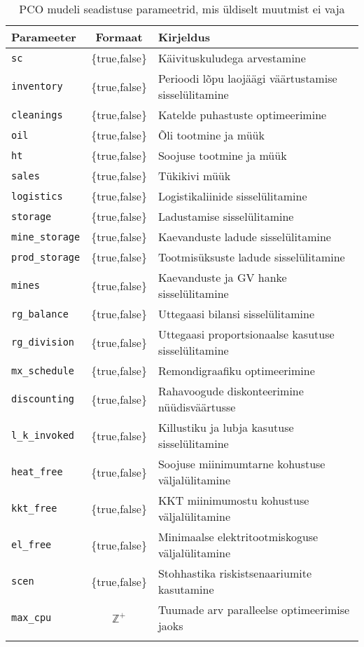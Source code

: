 \documentclass[10pt,a4paper]{article}
\begin{document}
\begin{table}
\begin{tabular}{l c l}
Parameeter & Formaat & Kirjeldus \\
\hline
\texttt{sc}              &  \{true,false\}&  Käivituskuludega arvestamine \\
\texttt{inventory}       &  \{true,false\}&  Perioodi lõpu laojäägi väärtustamise sisselülitamine\\
\texttt{cleanings}       &  \{true,false\}&  Katelde puhastuste optimeerimine \\
\texttt{oil}             &  \{true,false\}&  Õli tootmine ja müük\\
\texttt{ht}              &  \{true,false\}&  Soojuse tootmine ja müük\\
\texttt{sales}           &  \{true,false\}&  Tükikivi müük \\
\texttt{logistics}       &  \{true,false\}&  Logistikaliinide sisselülitamine \\
\texttt{storage}         &  \{true,false\}&  Ladustamise sisselülitamine \\
\texttt{mine\_storage}   &  \{true,false\}&  Kaevanduste ladude sisselülitamine \\
\texttt{prod\_storage}   &  \{true,false\}&  Tootmisüksuste ladude sisselülitamine \\
\texttt{mines}           &  \{true,false\}&  Kaevanduste ja GV hanke sisselülitamine \\
\texttt{rg\_balance}     &  \{true,false\}&  Uttegaasi bilansi sisselülitamine \\
\texttt{rg\_division}    &  \{true,false\}&  Uttegaasi proportsionaalse kasutuse sisselülitamine\\
\texttt{mx\_schedule}    &  \{true,false\}&  Remondigraafiku optimeerimine \\
\texttt{discounting}     &  \{true,false\}&  Rahavoogude diskonteerimine nüüdisväärtusse\\
\texttt{l\_k\_invoked}   &  \{true,false\}&  Killustiku ja lubja kasutuse sisselülitamine \\
\texttt{heat\_free}      &  \{true,false\}&  Soojuse miinimumtarne kohustuse väljalülitamine \\
\texttt{kkt\_free}       &  \{true,false\}&  KKT miinimumostu kohustuse väljalülitamine \\
\texttt{el\_free}        &  \{true,false\}&  Minimaalse elektritootmiskoguse väljalülitamine \\
\texttt{scen}            &  \{true,false\}&  Stohhastika riskistsenaariumite kasutamine \\
\texttt{max\_cpu}        &  $\mathbb{Z}^+$&  Tuumade arv paralleelse optimeerimise jaoks \\
\\  
\end{tabular}
\caption{PCO mudeli seadistuse parameetrid, mis üldiselt muutmist ei vaja}
\label{tab:conf_spec}
\end{table}


\appendix




\end{document}
